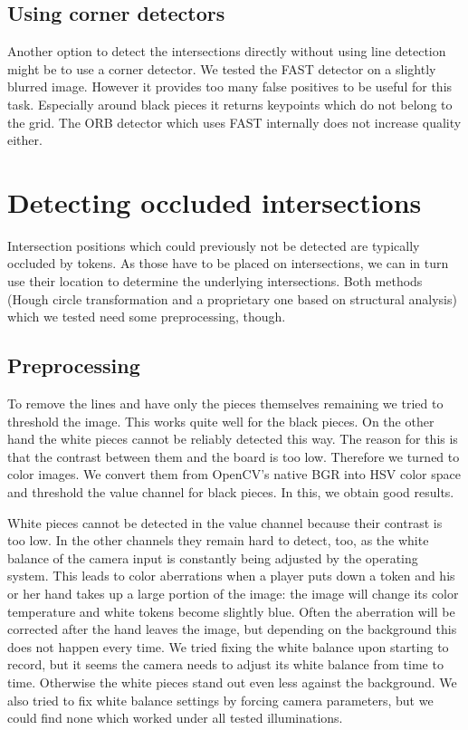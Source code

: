 	\subsection{Using corner detectors}
	\label{detector-visible-corners}
	Another option to detect the intersections directly without using line detection might be to use a corner detector. We tested the FAST \cite{rosten2006machine} detector on a slightly blurred image. However it provides too many false positives to be useful for this task. Especially around black pieces it returns keypoints which do not belong to the grid. The ORB detector which uses FAST internally does not increase quality either.

	\section{Detecting occluded intersections}
	\label{detector-occluded}
	Intersection positions which could previously not be detected are typically occluded by tokens. As those have to be placed on intersections, we can in turn use their location to determine the underlying intersections. Both methods (Hough circle transformation and a proprietary one based on structural analysis) which we tested need some preprocessing, though.

	\subsection{Preprocessing}
	\label{detector-occluded-preprocessing}
	To remove the lines and have only the pieces themselves remaining we tried to threshold the image. This works quite well for the black pieces. On the other hand the white pieces cannot be reliably detected this way. The reason for this is that the contrast between them and the board is too low. Therefore we turned to color images. We convert them from OpenCV's native BGR into HSV color space and threshold the value channel for black pieces. In this, we obtain good results.

	White pieces cannot be detected in the value channel because their contrast is too low. In the other channels they remain hard to detect, too, as the white balance of the camera input is constantly being adjusted by the operating system. This leads to color aberrations when a player puts down a token and his or her hand takes up a large portion of the image: the image will change its color temperature and white tokens become slightly blue. Often the aberration will be corrected after the hand leaves the image, but depending on the background this does not happen every time. We tried fixing the white balance upon starting to record, but it seems the camera needs to adjust its white balance from time to time. Otherwise the white pieces stand out even less against the background. We also tried to fix white balance settings by forcing camera parameters, but we could find none which worked under all tested illuminations.

